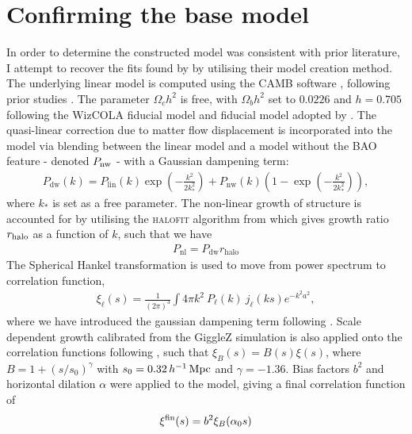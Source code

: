 \documentclass[titlesmallcaps, examinerscopy, copyrightpage]{uqthesis}
\begin{document}
\section{Confirming the base model}

In order to determine the constructed model was consistent with prior literature, I attempt to recover the fits found by \citet{BlakeKazin2011} by utilising their model creation method. The underlying linear model is computed using the CAMB software \citep{Lewis2000}, following prior studies \citep{BlakeDavis2011, SanchezScoccola2012, ChuangWang2012}. The parameter $\Omega_c h^2$ is free, with $\Omega_b h^2$ set to $0.0226$ and $h=0.705$ following the WizCOLA fiducial model and fiducial model adopted by \citet{BlakeKazin2011}. The quasi-linear correction due to matter flow displacement is incorporated into the model via blending between the linear model and a model without the BAO feature - denoted $P_{\rm{nw}}$ - with a Gaussian dampening term:
\begin{align}
P_{\text{dw}}(k) = P_{\text{lin}}(k) \exp\left(-\frac{k^2}{2k_*^2}\right)  + P_{\text{nw}}(k) \left(1 - \exp\left(-\frac{k^2}{2k_*^2}\right)\right),
\end{align}
where $k_*$ is set as a free parameter. The non-linear growth of structure is accounted for by utilising the \textsc{halofit} algorithm from \citet{Smith2003} which gives growth ratio $r_{\rm{halo}}$ as a function of $k$, such that we have
\begin{align}
P_{\text{nl}} = P_{\text{dw}} r_{\text{halo}}
\end{align}
The Spherical Hankel transformation is used to move from power spectrum to correlation function,
\begin{align}
\xi_\ell(s) = \frac{1}{(2\pi)^3} \int 4\pi k^2 \ P_\ell(k) \ j_\ell(ks) e^{-k^2 a^2},
\end{align}
where we have introduced the gaussian dampening term following \citet{AndersonAubourg2012}. Scale dependent growth calibrated from the GiggleZ simulation is also applied onto the correlation functions following \citet{BlakeDavis2011}, such that $\xi_B(s) = B(s) \xi(s)$, where $B = 1 + (s/s_0)^\gamma$ with $s_0 = 0.32\, h^{-1}\,\rm{Mpc}$ and $\gamma = -1.36$. Bias factors $b^2$ and horizontal dilation $\alpha$ were applied to the model, giving a final correlation function of 
\begin{align}
\xi^{\rm{fin}}(s) = b^2 \xi_B(\alpha_0 s)
\end{align}
\end{document}
